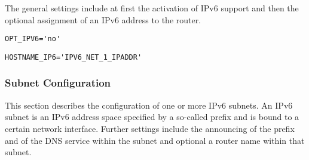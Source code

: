 The general settings include at first the activation of IPv6 support and then  
the optional assignment of an IPv6 address to the router.

\begin{description}
\verb*?OPT_IPV6='no'?

\verb*?HOSTNAME_IP6='IPV6_NET_1_IPADDR'?
\end{description}

\subsubsection{Subnet Configuration}

This section describes the configuration of one or more IPv6 subnets. 
An IPv6 subnet is an IPv6 address space specified by a so-called prefix
and is bound to a certain network interface. Further settings include the
announcing of the prefix and of the DNS service within the subnet
and optional a router name within that subnet.

